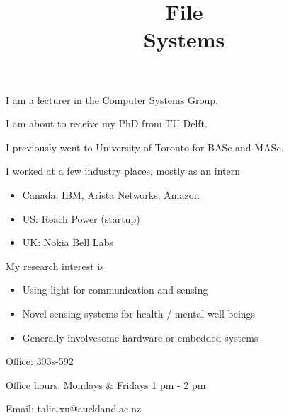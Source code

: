 

\title{File\\Systems}



\begin{frame}
    \titlepage
\end{frame}

\begin{slide}

	
    I am a lecturer in the Computer Systems Group.
    \bigskip

    I am about to receive my PhD from TU Delft.
    \bigskip

   I previously went to University of Toronto for BASc and MASc.

\end{slide}

\begin{slide}


    I worked at a few industry places, mostly as an intern 
    \begin{itemize}
    	\item Canada: IBM, Arista Networks, Amazon
	\item US: Reach Power (startup)
	\item UK: Nokia Bell Labs
    \end{itemize}

    \bigskip
    My research interest is 
    \begin{itemize}
	\item Using light for communication and sensing
	\item Novel sensing systems for health / mental well-beings
	\item Generally involvesome hardware or embedded systems
    \end{itemize}

\end{slide}

\begin{slide}


    Office: 303s-592
    \bigskip

    Office hours: Mondays \& Fridays 1 pm - 2 pm
    \bigskip

    Email: talia.xu@auckland.ac.nz

\end{slide}

